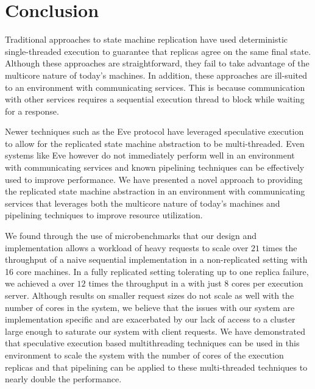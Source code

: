 \documentclass[11pt, oneside]{report}
\begin{document}
\chapter{Conclusion}\label{Conclusion}

Traditional approaches to state machine replication have used deterministic single-threaded execution to guarantee that replicas agree on the same final state. Although these approaches are straightforward, they fail to take advantage of the multicore nature of today's machines. 
In addition, these approaches are ill-suited to an environment with communicating services. This is because communication with other services requires a sequential execution thread to block while waiting for a response. 

Newer techniques such as the Eve protocol \cite{eve} have leveraged speculative execution to allow for the replicated state machine abstraction to be multi-threaded.
Even systems like Eve however do not immediately perform well in an environment with communicating services and known pipelining techniques can be effectively used to improve performance.
We have presented a novel approach to providing the replicated state machine abstraction in an environment with communicating services that leverages both the multicore nature of today's machines and pipelining techniques to improve resource utilization. 

We found through the use of microbenchmarks that our design and implementation allows a workload of heavy requests to scale over $21$ times the throughput of a naive sequential implementation in a non-replicated setting with 16 core machines.
In a fully replicated setting tolerating up to one replica failure, we achieved a over $12$ times the throughput in a with just 8 cores per execution server.
Although results on smaller request sizes do not scale as well with the number of cores in the system, we believe that the issues with our system are implementation specific and are exacerbated by our lack of access to a cluster large enough to saturate our system with client requests.
We have demonstrated that speculative execution based multithreading techniques can be used in this environment to scale the system with the number of cores of the execution replicas and that pipelining can be applied to these multi-threaded techniques to nearly double the performance.



\end{document}
